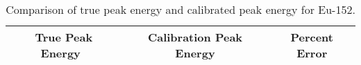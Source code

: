 \begin{table}[H]
  \centering 
  \caption{Comparison of true peak energy and calibrated peak energy for Eu-152.} 
  \begin{tabular}{|ccc|} 
    \hline 
    True Peak Energy~\cite{lblndata} & Calibration Peak Energy & Percent Error \\ 
    \hline 
    
    \hline  
  \end{tabular} 
  \label{tab:valEu152}
\end{table} 


